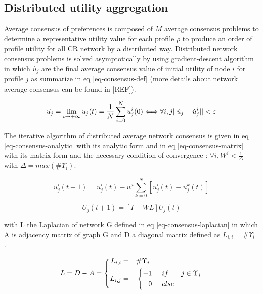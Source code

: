 \documentclass[10pt,twocolumn]{article}
\begin{document}
\subsection{Distributed utility aggregation}
Average consensus of preferences is composed of $M$ average consensus problems to determine a representative utility value for each profile $\rho$ to produce an order of profile utility for all CR network by a distributed way. Distributed network consensus problems is solved asymptotically by using gradient-descent algorithm in which $\dot{u_j}$ are the final average consensus value of initial utility of node $i$ for profile $j$ as summarize in eq \ref{eq-consensus-def} (more details about network average consensus can be found in [REF]). 

\begin{equation}
\label{eq-consensus-def}
\displaystyle
\dot{u_j} =  \lim_{t \to +\infty } u_j(t)  =  {1 \over N } \sum_{i=0}^N u_j^i(0)  \Longleftrightarrow \forall i,j || \dot{u}_j - \dot{u}_j^i || < \varepsilon
\end{equation}

The iterative algorithm of distributed average network consensus is given in eq \ref{eq-consensus-analytic} with its analytic form and in eq \ref{eq-consensus-matrix} with its matrix form and the necessary condition of convergence : $\forall i, W^i < \frac{1}{\Delta}$ with $\Delta = max(\#\Upsilon_i)$.

\begin{equation}
\label{eq-consensus-analytic}
\displaystyle
u_j^i(t+1) = u_j^i(t) - w^i \sum_{k=0}^N[u_j^i(t) - u_j^k(t)]
\end{equation}

\begin{equation}
\label{eq-consensus-matrix}
\displaystyle
U_j(t+1) = [I-WL]U_j(t)
\end{equation}

with L the Laplacian of network G defined in eq \ref{eq-consensus-laplacian} in which A is adjacency matrix of graph G and D a diagonal matrix defined as $L_{i,i} = \#\Upsilon_i$ .

\begin{equation}
\label{eq-consensus-laplacian}
L = D - A = \left\{
      \begin{aligned}
      L_{i,i} &= &\#\Upsilon_i\hspace{2.6cm}\\
      L_{i,j} &= &\left\{
                \begin{aligned}
                -1 \hspace{0.5cm} &if& j \in \Upsilon_i \\
                 0 \hspace{0.5cm} &else& \\
                \end{aligned}
                \right.
      \end{aligned}
    \right.
\end{equation}
\end{document}
